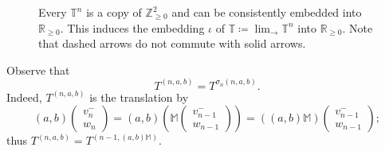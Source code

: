\documentclass{amsart}
\newcommand{\proj}{\operatorname{proj}}
\newcommand{\1}{{\mathbb 1 }}
\newcommand\PT{\mathbb{ T}}
\newcommand\M{\mathbb M}
\renewcommand{\tt}{\mathfrak{t}}
\newcommand{\R}{\mathbb{R}}
\newcommand{\Z}{\mathbb{Z}}
\theoremstyle{remark}
\numberwithin{equation}{section}
\theoremstyle{definition}
\theoremstyle{nonumberbreak}
\begin{document}
\begin{figure}[tp!]



{}
\caption{Every $\PT^n$ is a copy of $\Z^2_{\ge0}$ and can be consistently embedded into $\R_{\ge 0}$. This induces the embedding $\iota$ of $\displaystyle{\PT\coloneqq \lim_{\longrightarrow }\PT^{n}}$ into $\R_{\ge 0}$. 
Note that dashed arrows do not commute with solid arrows.}
\label{Fig:Diagram T^n}
\end{figure}

Observe that 
\begin{equation}
\label{eq:T n a b=n-1 c d}
T^{(n,a,b)}=T^{\sigma_n(n,a,b)}.
\end{equation}
Indeed, $T^{(n,a,b)}$ is the translation by
\[(a,b) \left(\begin{matrix} v_n^- \\ w_n  \end{matrix} \right)=(a,b) \left(\M  \left(\begin{matrix} v_{n-1}^- \\ w_{n-1}  \end{matrix} \right)\right)=
\left( (a,b) \M \right)  \left(\begin{matrix} v_{n-1}^- \\ w_{n-1}  \end{matrix}\right);\]
thus $T^{(n,a,b)}= T^{(n-1, (a,b)\M)}$. 
\end{document}
